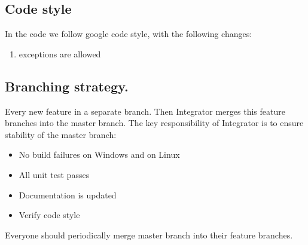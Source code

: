 \documentclass[11pt,a4paper,twoside]{report}
\begin{document}
\subsection{Code style}
In the code we follow google code style, with the following changes:
\begin{enumerate}
    \item exceptions are allowed
\end{enumerate}

\subsection{Branching strategy.}
Every new feature in a separate branch.
Then Integrator merges this feature branches into the master branch.
The key responsibility of Integrator is to ensure stability of the master branch:
\begin{itemize}
    \item No build failures on Windows and on Linux
    \item All unit test passes
    \item Documentation is updated
    \item Verify code style
\end{itemize}
Everyone should periodically merge master branch into their feature branches.
\end{document}
